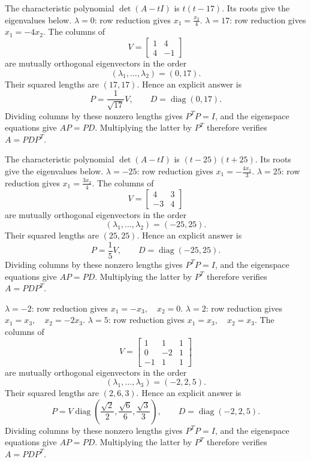 The characteristic polynomial $\det(A-tI)$ is $t \left(t - 17\right)$. Its roots give the eigenvalues below.
$\lambda=0$: row reduction gives \(x_{1}=\frac{x_{2}}{4}\).
$\lambda=17$: row reduction gives \(x_{1}=- 4 x_{2}\).
The columns of
\[
 V=\begin{bmatrix}1&4\\4&-1\end{bmatrix}
\]
are mutually orthogonal eigenvectors in the order
\[
 (\lambda_1,\ldots,\lambda_2)=(0,17).
\]
Their squared lengths are $(17,17)$. Hence an explicit answer is
\[
 P=\frac1{\sqrt{17}}V,\qquad
 D=\operatorname{diag}(0,17).
\]
Dividing columns by these nonzero lengths gives $P^TP=I$, and the
eigenspace equations give $AP=PD$. Multiplying the latter by $P^T$
therefore verifies $A=PDP^T$.

The characteristic polynomial $\det(A-tI)$ is $\left(t - 25\right) \left(t + 25\right)$. Its roots give the eigenvalues below.
$\lambda=-25$: row reduction gives \(x_{1}=- \frac{4 x_{2}}{3}\).
$\lambda=25$: row reduction gives \(x_{1}=\frac{3 x_{2}}{4}\).
The columns of
\[
 V=\begin{bmatrix}4&3\\-3&4\end{bmatrix}
\]
are mutually orthogonal eigenvectors in the order
\[
 (\lambda_1,\ldots,\lambda_2)=(-25,25).
\]
Their squared lengths are $(25,25)$. Hence an explicit answer is
\[
 P=\frac1{5}V,\qquad
 D=\operatorname{diag}(-25,25).
\]
Dividing columns by these nonzero lengths gives $P^TP=I$, and the
eigenspace equations give $AP=PD$. Multiplying the latter by $P^T$
therefore verifies $A=PDP^T$.

$\lambda=-2$: row reduction gives \(x_{1}=- x_{3},\quad x_{2}=0\).
$\lambda=2$: row reduction gives \(x_{1}=x_{3},\quad x_{2}=- 2 x_{3}\).
$\lambda=5$: row reduction gives \(x_{1}=x_{3},\quad x_{2}=x_{3}\).
The columns of
\[
 V=\begin{bmatrix}1&1&1\\0&-2&1\\-1&1&1\end{bmatrix}
\]
are mutually orthogonal eigenvectors in the order
\[
 (\lambda_1,\ldots,\lambda_3)=(-2,2,5).
\]
Their squared lengths are $(2,6,3)$. Hence an explicit answer is
\[
 P=V\operatorname{diag}(\frac{\sqrt{2}}{2},\frac{\sqrt{6}}{6},\frac{\sqrt{3}}{3}),\qquad
 D=\operatorname{diag}(-2,2,5).
\]
Dividing columns by these nonzero lengths gives $P^TP=I$, and the
eigenspace equations give $AP=PD$. Multiplying the latter by $P^T$
therefore verifies $A=PDP^T$.


